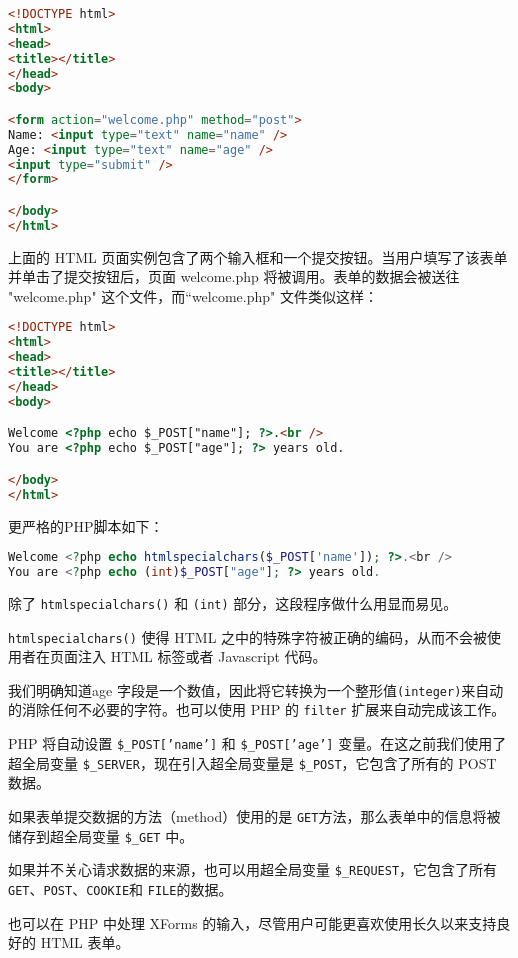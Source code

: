 \begin{lstlisting}[language=HTML]
<!DOCTYPE html>
<html>
<head>
<title></title>
</head>
<body>

<form action="welcome.php" method="post">
Name: <input type="text" name="name" />
Age: <input type="text" name="age" />
<input type="submit" />
</form>

</body>
</html>
\end{lstlisting}

上面的 HTML 页面实例包含了两个输入框和一个提交按钮。当用户填写了该表单并单击了提交按钮后，页面 welcome.php 将被调用。表单的数据会被送往 "welcome.php" 这个文件，而``welcome.php" 文件类似这样：

\begin{lstlisting}[language=HTML]
<!DOCTYPE html>
<html>
<head>
<title></title>
</head>
<body>

Welcome <?php echo $_POST["name"]; ?>.<br />
You are <?php echo $_POST["age"]; ?> years old.

</body>
</html>
\end{lstlisting}

更严格的PHP脚本如下：

\begin{lstlisting}[language=PHP]
Welcome <?php echo htmlspecialchars($_POST['name']); ?>.<br />
You are <?php echo (int)$_POST["age"]; ?> years old.
\end{lstlisting}

除了 \texttt{htmlspecialchars()} 和 \texttt{(int)} 部分，这段程序做什么用显而易见。

\texttt{htmlspecialchars()} 使得 HTML 之中的特殊字符被正确的编码，从而不会被使用者在页面注入 HTML 标签或者 Javascript 代码。

我们明确知道age 字段是一个数值，因此将它转换为一个整形值\texttt{(integer)}来自动的消除任何不必要的字符。也可以使用 PHP 的 \texttt{filter} 扩展来自动完成该工作。

PHP 将自动设置 \texttt{\$\_POST['name']} 和 \texttt{\$\_POST['age']} 变量。在这之前我们使用了超全局变量 \texttt{\$\_SERVER}，现在引入超全局变量是 \texttt{\$\_POST}，它包含了所有的 POST 数据。

如果表单提交数据的方法（method）使用的是 \texttt{GET}方法，那么表单中的信息将被储存到超全局变量 \texttt{\$\_GET} 中。

如果并不关心请求数据的来源，也可以用超全局变量 \texttt{\$\_REQUEST}，它包含了所有 \texttt{GET}、\texttt{POST}、\texttt{COOKIE}和 \texttt{FILE}的数据。

也可以在 PHP 中处理 XForms 的输入，尽管用户可能更喜欢使用长久以来支持良好的 HTML 表单。


